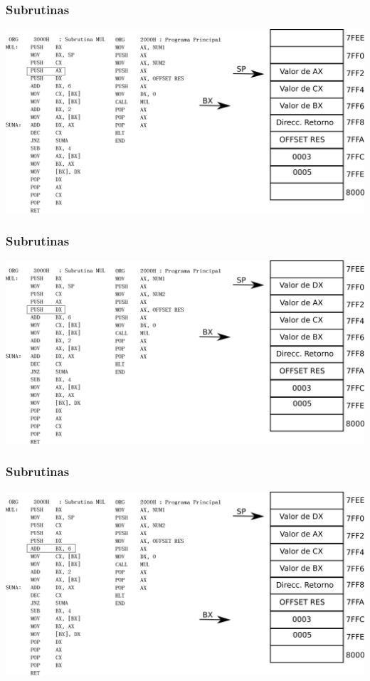 \documentclass{beamer}
\begin{document}
\begin{frame}
  \frametitle{Subrutinas}
\includegraphics[scale=0.70]{imgs/imagen_009.png}
\end{frame}
\begin{frame}
\frametitle{Subrutinas}
\includegraphics[scale=0.70]{imgs/imagen_010.png}
\end{frame}

\begin{frame}
\frametitle{Subrutinas}
\includegraphics[scale=0.70]{imgs/imagen_011.png}
\end{frame}
\end{document}
